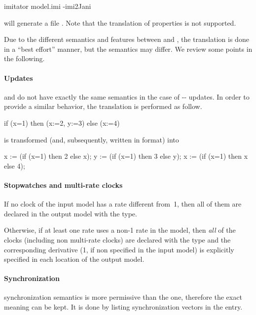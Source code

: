 \begin{terminal}
imitator model.imi -imi2Jani
\end{terminal}

\imitator{} will generate a file .
Note that the translation of properties is not supported.

Due to the different semantics and features between \imitator{} and \jani{}, the translation is done in a ``best effort'' manner, but the semantics may differ.
We review some points in the following.

\paragraph{Updates}
\imitator{} and \jani{} do not have exactly the same semantics in the case of -- updates.
In order to provide a similar behavior, the translation is performed as follow.

\begin{IMITATORmodel}
if (x=1) then (x:=2, y:=3) else (x:=4)
\end{IMITATORmodel}

\noindent{}is transformed (and, subsequently, written in \jani{} format) into

\begin{IMITATORmodel}
x := (if (x=1) then 2 else x);
y := (if (x=1) then 3 else y);
x := (if (x=1) then x else 4);
\end{IMITATORmodel}


\paragraph{Stopwatches and multi-rate clocks}
If no clock of the input model has a rate different from~1, then all of them are declared in the output \jani{} model with the  type.

Otherwise, if at least one rate uses a non-1 rate in the \imitator{} model, then \emph{all} of the clocks (including non multi-rate clocks) are declared with the  type and the corresponding derivative (1, if non specified in the \imitator{} input model) is explicitly specified in each location of the output model.

\paragraph{Synchronization}
\jani{} synchronization semantics is more permissive than the \imitator{} one, therefore the exact meaning can be kept.
It is done by listing synchronization vectors in the  entry.

